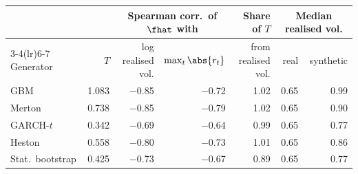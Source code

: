 \begin{tabular}{lrrrrrr}
\toprule
 & & \multicolumn{2}{c}{Spearman corr.\ of $\fhat$ with} & Share of $T$ & \multicolumn{2}{c}{Median realised vol.} \\
\cmidrule(lr){3-4}\cmidrule(lr){6-7}
Generator & $T$ & log realised vol. & $\max_t\abs{r_t}$ & from realised vol. & real & synthetic \\
\midrule
GBM & 1.083 & $-$0.85 & $-$0.72 & 1.02 & 0.65 & 0.99 \\
Merton & 0.738 & $-$0.85 & $-$0.79 & 1.02 & 0.65 & 0.90 \\
GARCH-$t$ & 0.342 & $-$0.69 & $-$0.64 & 0.99 & 0.65 & 0.77 \\
Heston & 0.558 & $-$0.80 & $-$0.73 & 1.01 & 0.65 & 0.86 \\
Stat.\ bootstrap & 0.425 & $-$0.73 & $-$0.67 & 0.89 & 0.65 & 0.77 \\
\bottomrule
\end{tabular}
